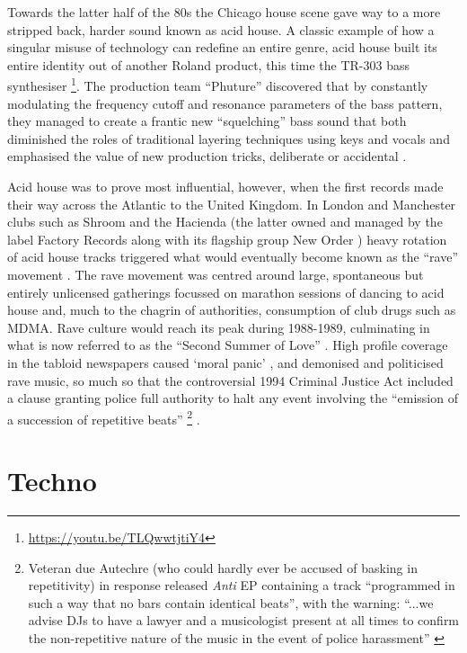 Towards the latter half of the 80s the Chicago house scene gave way to a more stripped back, harder sound known as acid house. A classic example of how a singular misuse of technology can redefine an entire genre, acid house built its entire identity out of another Roland product, this time the TR-303 bass synthesiser \citep{McLeod2001}\footnote{\url{https://youtu.be/TLQwwtjtiY4}}. The production team “Phuture” discovered that by constantly modulating the frequency cutoff and resonance parameters of the bass pattern, they managed to create a frantic new “squelching” bass sound that both diminished the roles of traditional layering techniques using keys and vocals and emphasised the value of new production tricks, deliberate or accidental \citep{Vitos2014}. 

Acid house was to prove most influential, however, when the first records made their way across the Atlantic to the United Kingdom. In London and Manchester clubs such as Shroom and the Hacienda (the latter owned and managed by the label Factory Records along with its flagship group New Order \citep{hook2009hacienda}) heavy rotation of acid house tracks triggered what would eventually become known as the “rave” movement . The rave movement was centred around large, spontaneous but entirely unlicensed gatherings focussed on marathon sessions of dancing to acid house and, much to the chagrin of authorities, consumption of club drugs such as MDMA. Rave culture would reach its peak during 1988-1989, culminating in what is now referred to as the “Second Summer of Love” \citep{Gore1997}. High profile coverage in the tabloid newspapers caused `moral panic' \citep{Martin1999}, and demonised and politicised rave music, so much so that the controversial 1994 Criminal Justice Act included a clause granting police full authority to halt any event involving the “emission of a succession of repetitive beats” \citep{gilbert1997soundtrack} \footnote{Veteran due Autechre (who could hardly ever be accused of basking in repetitivity) in response released \textit{Anti} EP containing a track ``programmed in such a way that no bars contain identical beats'', with the warning: ``...we advise DJs to have a lawyer and a musicologist present at all times to confirm the non-repetitive nature of the music in the event of police harassment'' \citep{Atkinson2007}} .

\section{Techno}

